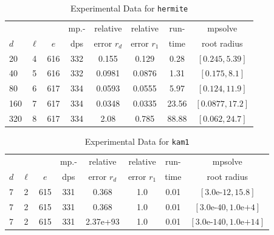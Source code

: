 \documentclass[runningheads]{llncs}
\begin{document}
\begin{table}
\caption{Experimental Data for \texttt{hermite}} %
\label{tab:hermite}
\vskip -0.15in
\begin{center}
\begin{small}
\begin{sc}
\begin{tabular}{lccccccc}
\toprule
&  &  & mp.-& relative  & relative & run- & mpsolve \\
$d$& $\ell$& $e$ & dps&error $r_d$       & error $r_1$ &time& root radius\\
\midrule
 20 & 4 & 616 & 332 & 0.155 & 0.129 & 0.28 & $[0.245, 5.39]$\\
 40 & 5 & 616 & 332 & 0.0981 & 0.0876 & 1.31 & $[0.175, 8.1]$\\
 80 & 6 & 617 & 334 & 0.0593 & 0.0555 & 5.97 & $[0.124, 11.9]$\\
 160 & 7 & 617 & 334 & 0.0348 & 0.0335 & 23.56 & $[0.0877, 17.2]$\\
 320 & 8 & 617 & 334 & 2.08 & 0.785 & 88.88 & $[0.062, 24.7]$\\
\bottomrule
\end{tabular}
\end{sc}
\end{small}
\end{center}
\vskip 0.05in
\end{table}

\begin{table}
\caption{Experimental Data for \texttt{kam1}} %
\label{tab:kam1}
\vskip -0.15in
\begin{center}
\begin{small}
\begin{sc}
\begin{tabular}{lccccccc}
\toprule
&  &  & mp.-& relative  & relative & run- & mpsolve \\
$d$& $\ell$& $e$ & dps&error $r_d$       & error $r_1$ &time& root radius\\
\midrule
 7 & 2 & 615 & 331 & 0.368 & 1.0 & 0.01 & $[3.0\text{e-}12, 15.8]$\\
 7 & 2 & 615 & 331 & 0.368 & 1.0 & 0.01 & $[3.0\text{e-}40, 1.0\text{e+}4]$\\
 7 & 2 & 615 & 331 & 2.37e+93 & 1.0 & 0.01 & $[3.0\text{e-}140, 1.0\text{e+}14]$\\
\bottomrule
\end{tabular}
\end{sc}
\end{small}
\end{center}
\vskip 0.05in
\end{table}
\end{document}
